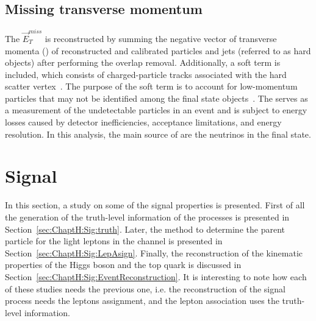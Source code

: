 %
%
\subsection{Missing transverse momentum}
The $\overrightarrow{E}_{T}^{miss}$ is reconstructed by summing the 
negative vector of transverse momenta (\pT) of reconstructed and calibrated particles and 
jets (referred to as hard objects) after performing the overlap removal. 
Additionally, a soft term is included, which consists of charged-particle tracks associated 
with the hard scatter vertex~\cite{PERF-2016-07, ATLAS-CONF-2018-023}. The purpose of
the soft term is to account for low-momentum particles that may not be identified among the 
final state objects~\cite{PERF-2011-07, PERF-2014-04, ATL-PHYS-PUB-2015-027}. 
The \MET serves as a measurement of the undetectable particles in an event and is subject to 
energy losses caused by detector inefficiencies, acceptance limitations, and energy resolution.
In this analysis, the main source of \MET are the neutrinos in the final state.

\section{Signal}
\label{sec:ChaptH:Sig}
In this section, a study on some of the signal properties is presented.
First of all the generation of the truth-level information of the \tHq processes
is presented in Section~\ref{sec:ChaptH:Sig:truth}. Later, the method to 
determine the parent particle for the light leptons in the \dilepSStau channel
is presented in Section~\ref{sec:ChaptH:Sig:LepAsign}. Finally, the reconstruction
of the kinematic properties of the Higgs boson and the top quark is discussed 
in Section~\ref{sec:ChaptH:Sig:EventReconstruction}.
It is interesting to note how each of these studies needs the previous one, i.e.
the reconstruction of the signal process needs the leptons assignment, and
the lepton association uses the truth-level information.



